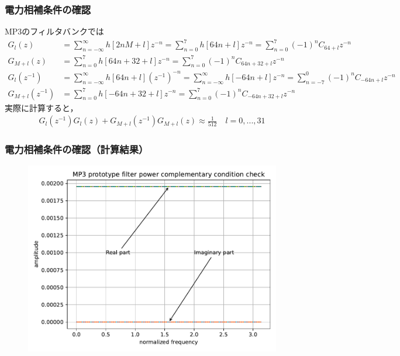 \documentclass[14pt,xcolor=dvipsnames,table,dvipdfmx]{beamer}
\begin{document}
\begin{frame}[c]
    \frametitle{電力相補条件の確認}
    MP3のフィルタバンクでは
    \scriptsize
    \begin{align*}
        G_{l}(z) &= \sum_{n = -\infty}^{\infty} h[2nM + l] z^{-n} = \sum_{n = 0}^{7} h[64n + l] z^{-n} = \sum_{n = 0}^{7} (-1)^{n} C_{64 + l} z^{-n} \\
        G_{M+l}(z) &= \sum_{n = 0}^{7} h[64n + 32 + l] z^{-n} = \sum_{n = 0}^{7} (-1)^{n} C_{64n + 32 + l} z^{-n} \\
        G_{l}(z^{-1}) &= \sum_{n = -\infty}^{\infty} h[64n + l] (z^{-1})^{-n} = \sum_{n = -\infty}^{\infty} h[-64n + l] z^{-n} = \sum_{n = -7}^{0} (-1)^{n} C_{-64n + l} z^{-n} \\
        G_{M+l}(z^{-1}) &= \sum_{n = 0}^{7} h[-64n + 32 + l] z^{-n} = \sum_{n = 0}^{7} (-1)^{n} C_{-64n + 32 + l} z^{-n}
    \end{align*}
    \normalsize
    実際に計算すると，
    \begin{align*}
        G_{l}(z^{-1})G_{l}(z) + G_{M+l}(z^{-1})G_{M+l}(z) \approx \frac{1}{512} \quad l = 0, ..., 31
    \end{align*}
\end{frame}

\begin{frame}[c]
    \frametitle{電力相補条件の確認（計算結果）}
    \begin{figure}
        \includegraphics[width=115mm]{./figs/mp3_encoder_prototype_filter_power_complementary_condition.pdf}
    \end{figure}
\end{frame}

\end{document}

